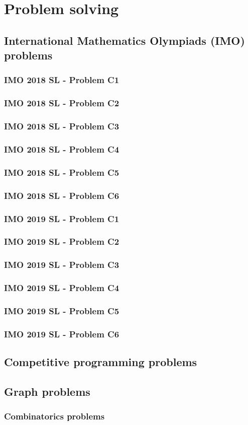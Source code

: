 \documentclass[12pt,openany,oneside]{book}
\begin{document}
\part{Problem solving}

\chapter{International Mathematics Olympiads (IMO) problems}

\section{IMO 2018 SL - Problem C1}
\section{IMO 2018 SL - Problem C2}
\section{IMO 2018 SL - Problem C3}
\section{IMO 2018 SL - Problem C4}
\section{IMO 2018 SL - Problem C5}
\section{IMO 2018 SL - Problem C6}

\section{IMO 2019 SL - Problem C1}
\section{IMO 2019 SL - Problem C2}
\section{IMO 2019 SL - Problem C3}
\section{IMO 2019 SL - Problem C4}
\section{IMO 2019 SL - Problem C5}
\section{IMO 2019 SL - Problem C6}

\chapter{Competitive programming problems}

\chapter{Graph problems}
\section{Combinatorics problems}



\end{document}
